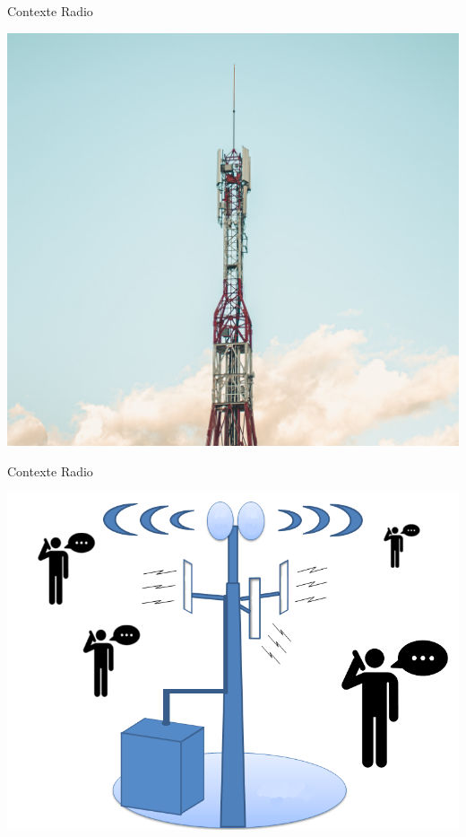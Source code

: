 \documentclass[10 pt]{beamer}
\begin{document}
\begin{frame}{Contexte Radio}
\begin{center}
  \includegraphics [width=\textwidth]{radio.jpg} 
\end{center}

\end{frame}
\begin{frame}{Contexte Radio}
\begin{center}
  \includegraphics[scale=0.3]{btsppl.png}

\end{center}

\end{frame}
\end{document}
